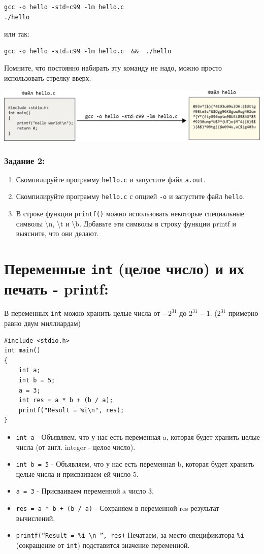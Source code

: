 \documentclass{article}
\begin{document}
\begin{verbatim}
gcc -o hello -std=c99 -lm hello.c
./hello
\end{verbatim}
или так:
\begin{verbatim}
gcc -o hello -std=c99 -lm hello.c  &&  ./hello
\end{verbatim}
Помните, что постоянно набирать эту команду не надо, можно просто использовать стрелку вверх.
\begin{center}
\includegraphics[scale=1]{../images/gcc_complex.png}
\end{center}

\subsubsection*{Задание 2:}
\begin{enumerate}
\item Скомпилируйте программу \texttt{hello.c} и запустите файл \texttt{a.out}.
\item Скомпилируйте программу \texttt{hello.c} с опцией \texttt{-o} и запустите файл \texttt{hello}.
\item В строке функции \texttt{printf()} можно использовать некоторые специальные символы \textbackslash n, \textbackslash t и \textbackslash b. Добавьте эти символы в строку функции printf и выясните, что они делают.
\end{enumerate}

\section*{Переменные \texttt{int} (целое число) и их печать - printf:}
В переменных \texttt{int} можно хранить целые числа от $-2^{31}$ до $2^{31} - 1$. ($2^{31}$ примерно равно двум миллиардам)
\begin{lstlisting}
#include <stdio.h>
int main() 
{
    int a;
    int b = 5;
    a = 3;
    int res = a * b + (b / a);
    printf("Result = %i\n", res);
}
\end{lstlisting}

\begin{itemize}
\item \texttt{int a} - Объявляем, что у нас есть переменная a, которая будет хранить целые числа (от англ. integer - целое число).
\item \texttt{int b = 5} - Объявляем, что у нас есть переменная b, которая будет хранить целые числа и присваиваем ей число 5.
\item \texttt{a = 3} - Присваиваем переменной a число 3.
\item \texttt{res = a * b + (b / a)} - Сохраняем в переменной res результат вычислений.
\item \texttt{printf(``Result = \%i \textbackslash n '', res)} Печатаем, за место спецификатора \texttt{\%i} (сокращение от \texttt{int}) подставится значение переменной.
\end{itemize}
\end{document}
